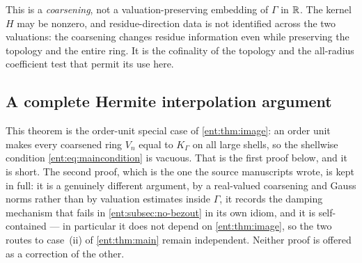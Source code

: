 \documentclass[11pt]{article}
\theoremstyle{plain}
\theoremstyle{plain}
\theoremstyle{plain}
\theoremstyle{definition}
\theoremstyle{definition}
\theoremstyle{definition}
\theoremstyle{definition}
\theoremstyle{remark}
\newcommand{\K}{K_\Gamma}\newcommand{\KD}{K_\Delta}
\begin{document}
This is a \emph{coarsening}, not a valuation-preserving embedding of $\Gamma$
in $\mathbb R$. The kernel $H$ may be nonzero, and residue-direction data is not
identified across the two valuations: the coarsening changes residue
information even while preserving the topology and the entire ring. It is the
cofinality of the topology and the all-radius coefficient test that permit
its use here.

\subsection{A complete Hermite interpolation argument}
This theorem is the order-unit special case of \cref{ent:thm:image}: an order
unit makes every coarsened ring $V_n$ equal to $\K$ on all large shells, so
the shellwise condition \eqref{ent:eq:maincondition} is vacuous. That is the
first proof below, and it is short. The second proof, which is the one the
source manuscripts wrote, is kept in full: it is a genuinely different
argument, by a real-valued coarsening and Gauss norms rather than by
valuation estimates inside $\Gamma$, it records the damping mechanism that
fails in \cref{ent:subsec:no-bezout} in its own idiom, and it is
self-contained --- in particular it does not depend on \cref{ent:thm:image},
so the two routes to case~(ii) of \cref{ent:thm:main} remain independent.
Neither proof is offered as a correction of the other.
\end{document}

